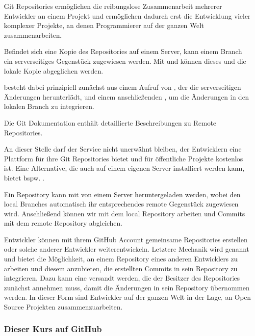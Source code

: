 \documentclass[parskip=half, final]{scrreprt}
\begin{document}
Git Repositories ermöglichen die reibungslose Zusammenarbeit mehrerer Entwickler an einem Projekt und ermöglichen dadurch erst die Entwicklung vieler komplexer Projekte, an denen Programmierer auf der ganzen Welt zusammenarbeiten.

Befindet sich eine Kopie des Repositories auf einem Server, kann einem Branch ein serverseitiges Gegenstück zugewiesen werden. Mit  und  können dieses  und die lokale Kopie abgeglichen werden.

 besteht dabei prinzipiell zunächst aus einem Aufruf von , der die serverseitigen Änderungen herunterlädt, und einem anschließenden , um die Änderungen in den lokalen Branch zu integrieren.

Die Git Dokumentation  enthält detaillierte Beschreibungen zu Remote Repositories.

An dieser Stelle darf der Service  nicht unerwähnt bleiben, der Entwicklern eine Plattform für ihre Git Repositories bietet und für öffentliche Projekte kostenlos ist. Eine Alternative, die auch auf einem eigenen Server installiert werden kann, bietet bspw. .

Ein Repository kann mit  von einem Server heruntergeladen werden, wobei den local Branches automatisch ihr entsprechendes remote Gegenstück zugewiesen wird. Anschließend können wir mit dem local Repository arbeiten und Commits mit dem remote Repository abgleichen.

Entwickler können mit ihrem GitHub Account gemeinsame Repositories erstellen oder solche anderer Entwickler weiterentwickeln. Letztere Mechanik wird  genannt und bietet die Möglichkeit, an einem Repository eines anderen Entwicklers zu arbeiten und diesem anzubieten, die erstellten Commits in sein Repository zu integrieren. Dazu kann eine  versandt werden, die der Besitzer des Repositories zunächst annehmen muss, damit die Änderungen in sein Repository übernommen werden. In dieser Form sind Entwickler auf der ganzen Welt in der Lage, an Open Source Projekten zusammenzuarbeiten.

\subsubsection{Dieser Kurs auf GitHub}
\end{document}
